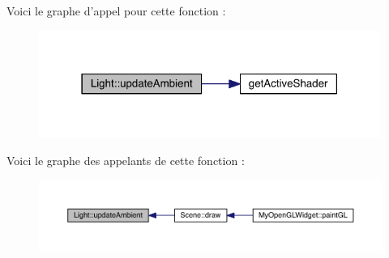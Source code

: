 Voici le graphe d'appel pour cette fonction \+:
\nopagebreak
\begin{figure}[H]
\begin{center}
\leavevmode
\includegraphics[width=316pt]{class_light_a53ce58fd783207da18aa7dc3465841ac_cgraph}
\end{center}
\end{figure}




Voici le graphe des appelants de cette fonction \+:
\nopagebreak
\begin{figure}[H]
\begin{center}
\leavevmode
\includegraphics[width=350pt]{class_light_a53ce58fd783207da18aa7dc3465841ac_icgraph}
\end{center}
\end{figure}




